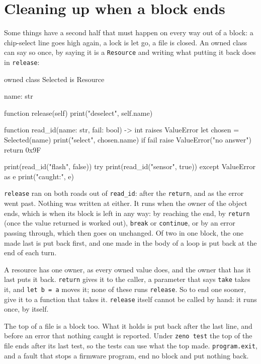 \section{Cleaning up when a block ends}

Some things have a second half that must happen on every way out of a
block: a chip-select line goes high again, a lock is let go, a file is
closed. An owned class can say so once, by saying it is a
\verb|Resource| and writing what putting it back does in
\verb|release|:

\begin{zeno}[file=select.zeno, dir=resource]
owned class Selected is Resource {
    name: str

    function release(self) {
        print("deselect", self.name)
    }
}

function read_id(name: str, fail: bool) -> int raises ValueError {
    let chosen = Selected(name)
    print("select", chosen.name)
    if fail {
        raise ValueError("no answer")
    }
    return 0x9F
}

print(read_id("flash", false))
try {
    print(read_id("sensor", true))
} except ValueError as e {
    print("caught:", e)
}
\end{zeno}

\verb|release| ran on both roads out of \verb|read_id|: after the
\verb|return|, and as the error went past. Nothing was written at
either. It runs when the owner of the object ends, which is when its
block is left in any way: by reaching the end, by \verb|return| (once
the value returned is worked out), \verb|break| or \verb|continue|, or
by an error passing through, which then goes on unchanged. Of two in
one block, the one made last is put back first, and one made in the
body of a loop is put back at the end of each turn.

A resource has one owner, as every owned value does, and the owner
that has it last puts it back. \verb|return| gives it to the caller, a
parameter that says \verb|take| takes it, and \verb|let b = a| moves
it; none of these runs \verb|release|. So to end one sooner, give it
to a function that takes it. \verb|release| itself cannot be called by
hand: it runs once, by itself.

The top of a file is a block too. What it holds is put back after the
last line, and before an error that nothing caught is reported. Under
\verb|zeno test| the top of the file ends after its last test, so the
tests can use what the top made. \verb|program.exit|, and a fault that
stops a firmware program, end no block and put nothing back.

